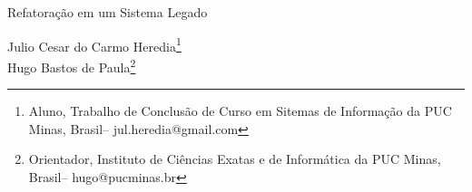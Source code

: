 \documentclass[a4paper,12pt,Times]{article}
\makeatletter
\newcommand{\monog}{Refatoração em um Sistema Legado}
\newcommand{\origem}{Brasil}
\newcommand{\AutorA}{Julio Cesar do Carmo Heredia}
\newcommand{\funcaoA}{Aluno}
\newcommand{\emailA}{jul.heredia@gmail.com}
\newcommand{\cursA}{Trabalho de Conclusão de Curso em Sitemas de Informação da PUC Minas}
\newcommand{\AutorB}{Hugo Bastos de Paula}
\newcommand{\funcaoB}{Orientador}
\newcommand{\emailB}{hugo@pucminas.br}
\newcommand{\cursB}{Instituto de Ciências Exatas e de Informática da PUC Minas}
\newcommand{\keyword}[1]{\textsf{#1}}
\makeatother
\begin{document}
	\begin{flushleft}
		\vspace{0cm} {
			\singlespacing \Large{\monog \\ }
		}
	\end{flushleft}
	
	\begin{flushright}
		\singlespacing 
		\normalsize{\AutorA \footnote{\funcaoA, \cursA, \origem -- \emailA }} \\
		\normalsize{\AutorB \footnote{\funcaoB, \cursB, \origem -- \emailB }} \\


	\end{flushright}
	\thispagestyle{empty}
	
	\begin{abstract}
		\noindent
			Este trabalho aborda a refatoração de código legado em um sistema de venda de passagens escrito em Java. Esta abordagem se apoia na dificuldade dos desenvolvedores ao encontrar um código em que a sua estrutura original esteja com a sua integridade comprometida e com tecnologias obsoletas. São apresentadas neste trabalho, técnicas de refatoração que levaram este código a ter principalmente mais inteligibilidade, para que seja um sistema de fácil compreensão para seus desenvolvedores. O trabalho também tem o intuito de quantificar a melhoria do código refatorado. O código será metrificado com o auxílio das ferramentas SonarQube e Metrics. Essas ferramentas farão o comparativo do antes e pós refatorações, com o propósito de relatar a melhoria na qualidade de software após o término das refatorações. Foram avaliados dois projetos, o projeto Cliente e o Servidor. O projeto Cliente teve uma melhor margem na melhoria da qualidade de software em relação ao projeto Servidor, onde ouve uma melhoria significativa nas métricas relacionadas à complexidade do código, de 14,44\% na análise do SonarQube e de 44,26\% na complexidade ciclomática no relatório do Metrics.
		\\\textbf{\keyword{Palavras-chave: }} Refatoração, Técnicas de Refatoração, Sistemas Legados, Qualidade de Software e Métricas de Software.
	\end{abstract}
	
\end{document}
